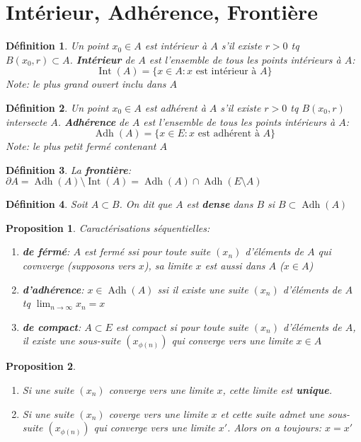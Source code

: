 \documentclass[a4paper]{article}
\newtheorem{definition}{Définition}[section]
\newtheorem{proposition}{Proposition}[section]
\begin{document}
\section{Intérieur, Adhérence, Frontière}
\begin{definition} 
    Un point $x_0 \in A$ est intérieur à $A$ s'il existe  $r > 0$ tq  $B(x_0, r) \subset A$. \textbf{Intérieur} de $A$ est l'ensemble de tous les points intérieurs à  $A$:
     \[
         \operatorname{Int}(A) = \{ x \in A : x \text{ est intérieur à } A \}
    \] 
    Note: le plus grand ouvert inclu dans $A$
\end{definition}
\begin{definition} 
    Un point $x_0 \in A$ est adhérent à $A$ s'il existe  $r > 0$ tq  $B(x_0, r)$ intersecte $A$. \textbf{Adhérence} de $A$ est l'ensemble de tous les points intérieurs à  $A$:
     \[
         \operatorname{Adh}(A) = \{ x \in E : x \text{ est adhérent à } A \}
    \] 
    Note: le plus petit fermé contenant $A$
\end{definition}
\begin{definition}
    La \textbf{frontière}: $\partial A = \operatorname{Adh}(A) \setminus \operatorname{Int}(A) = \operatorname{Adh}(A) \cap \operatorname{Adh}(E \setminus A)$
\end{definition}

\begin{definition}
    Soit $A \subset B$. On dit que $A$ est \textbf{dense} dans  $B$ si  $B \subset \operatorname{Adh}(A)$
\end{definition}
\begin{proposition} Caractérisations séquentielles:
   \begin{enumerate}
       \item \textbf{de férmé}: $A$ est fermé ssi pour toute suite  $(x_n)$ d'éléments de  $A$ qui covnverge (supposons vers $x$), sa limite $x$ est aussi dans  $A$ ($x \in A$)
       \item \textbf{d'adhérence}: $x \in \operatorname{Adh}(A)$ ssi il existe une suite  $(x_n)$ d'éléments de  $A$ tq  $\lim_{n \to \infty} x_n = x$
       \item \textbf{de compact}: $A \subset E$ est compact si pour toute suite $(x_n)$ d'éléments de  $A$, il existe une sous-suite  $(x_{\phi(n)})$ qui converge vers une limite  $x \in A$
   \end{enumerate} 
\end{proposition}
\begin{proposition}
   \begin{enumerate}
       \item Si une suite $(x_n)$ converge vers une limite  $x$, cette limite est \textbf{unique}.
       \item Si une suite  $(x_n)$ coverge vers une limite  $x$ et cette suite admet une sous-suite  $(x_{\phi(n)})$ qui converge vers une limite  $x'$. Alors on a toujours:  $x = x'$
   \end{enumerate} 
\end{proposition}
\end{document}
